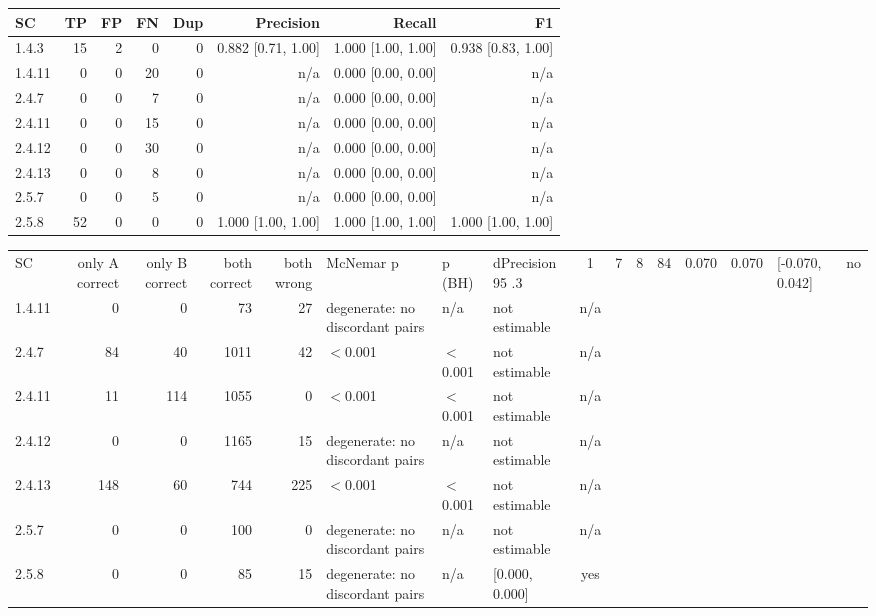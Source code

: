 \begin{tabular}{lrrrrrrr}
\hline
SC & TP & FP & FN & Dup & Precision & Recall & F1 \\
\hline
1.4.3 & 15 & 2 & 0 & 0 & 0.882 [0.71, 1.00] & 1.000 [1.00, 1.00] & 0.938 [0.83, 1.00] \\
1.4.11 & 0 & 0 & 20 & 0 & n/a & 0.000 [0.00, 0.00] & n/a \\
2.4.7 & 0 & 0 & 7 & 0 & n/a & 0.000 [0.00, 0.00] & n/a \\
2.4.11 & 0 & 0 & 15 & 0 & n/a & 0.000 [0.00, 0.00] & n/a \\
2.4.12 & 0 & 0 & 30 & 0 & n/a & 0.000 [0.00, 0.00] & n/a \\
2.4.13 & 0 & 0 & 8 & 0 & n/a & 0.000 [0.00, 0.00] & n/a \\
2.5.7 & 0 & 0 & 5 & 0 & n/a & 0.000 [0.00, 0.00] & n/a \\
2.5.8 & 52 & 0 & 0 & 0 & 1.000 [1.00, 1.00] & 1.000 [1.00, 1.00] & 1.000 [1.00, 1.00] \\
\hline
\end{tabular}

\begin{tabular}{lrrrrlllc}
\hline
SC & only A correct & only B correct & both correct & both wrong & McNemar p & p (BH) & dPrecision 95%
.3 & 1 & 7 & 8 & 84 & 0.070 & 0.070 & [-0.070, 0.042] & no \\
1.4.11 & 0 & 0 & 73 & 27 & degenerate: no discordant pairs & n/a & not estimable & n/a \\
2.4.7 & 84 & 40 & 1011 & 42 & $<$0.001 & $<$0.001 & not estimable & n/a \\
2.4.11 & 11 & 114 & 1055 & 0 & $<$0.001 & $<$0.001 & not estimable & n/a \\
2.4.12 & 0 & 0 & 1165 & 15 & degenerate: no discordant pairs & n/a & not estimable & n/a \\
2.4.13 & 148 & 60 & 744 & 225 & $<$0.001 & $<$0.001 & not estimable & n/a \\
2.5.7 & 0 & 0 & 100 & 0 & degenerate: no discordant pairs & n/a & not estimable & n/a \\
2.5.8 & 0 & 0 & 85 & 15 & degenerate: no discordant pairs & n/a & [0.000, 0.000] & yes \\
\hline
\end{tabular}

